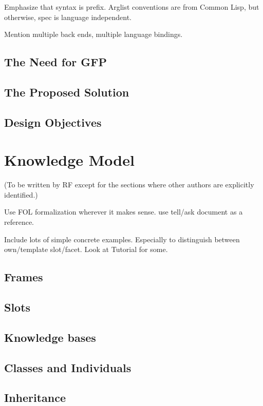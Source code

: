 Emphasize that syntax is prefix.  Arglist conventions are from Common
Lisp, but otherwise, spec is language independent.

Mention multiple back ends, multiple language bindings.

\section{The Need for GFP}

\section{The Proposed Solution}

\section{Design Objectives}

\chapter{Knowledge Model}
(To be written by RF except for the sections where other
authors are explicitly identified.)

Use FOL formalization wherever it makes sense.  use  tell/ask document
as a reference.

Include lots of simple concrete examples.  Especially to distinguish
between own/template slot/facet.  Look at Tutorial for some.

\section{Frames}

\section{Slots}

\section{Knowledge bases}

\section{Classes and Individuals}

\section{Inheritance}

